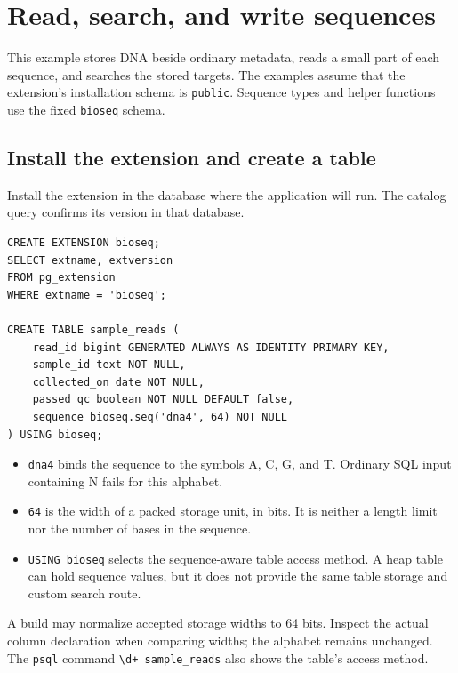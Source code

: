 \section{Read, search, and write sequences}
\label{sec:appendix-quick-start}

This example stores DNA beside ordinary metadata, reads a small part of each
sequence, and searches the stored targets. The examples assume that the
extension's installation schema is \texttt{public}. Sequence types and helper
functions use the fixed \texttt{bioseq} schema.

\subsection{Install the extension and create a table}

Install the extension in the database where the application will run. The
catalog query confirms its version in that database.

\par\noindent\begin{minipage}{\linewidth}
\begin{lstlisting}[style=bioseq-appendix-sql]
CREATE EXTENSION bioseq;
SELECT extname, extversion
FROM pg_extension
WHERE extname = 'bioseq';

CREATE TABLE sample_reads (
    read_id bigint GENERATED ALWAYS AS IDENTITY PRIMARY KEY,
    sample_id text NOT NULL,
    collected_on date NOT NULL,
    passed_qc boolean NOT NULL DEFAULT false,
    sequence bioseq.seq('dna4', 64) NOT NULL
) USING bioseq;
\end{lstlisting}
\end{minipage}

\begin{itemize}
  \item \texttt{dna4} binds the sequence to the symbols A, C, G, and T.
    Ordinary SQL input containing N fails for this alphabet.
  \item \texttt{64} is the width of a packed storage unit, in bits. It is
    neither a length limit nor the number of bases in the sequence.
  \item \texttt{USING bioseq} selects the sequence-aware table access method.
    A heap table can hold sequence values, but it does not provide the same
    table storage and custom search route.
\end{itemize}

A build may normalize accepted storage widths to 64 bits. Inspect the actual
column declaration when comparing widths; the alphabet remains unchanged.
The \texttt{psql} command \texttt{\textbackslash d+ sample\_reads} also shows
the table's access method.

